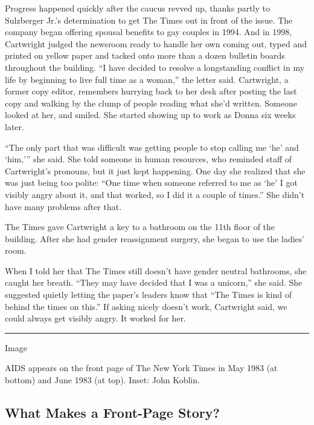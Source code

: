 Progress happened quickly after the caucus revved up, thanks partly to
Sulzberger Jr.'s determination to get The Times out in front of the
issue. The company began offering spousal benefits to gay couples in
1994. And in 1998, Cartwright judged the newsroom ready to handle her
own coming out, typed and printed on yellow paper and tacked onto more
than a dozen bulletin boards throughout the building. ``I have decided
to resolve a longstanding conflict in my life by beginning to live full
time as a woman,'' the letter said. Cartwright, a former copy editor,
remembers hurrying back to her desk after posting the last copy and
walking by the clump of people reading what she'd written. Someone
looked at her, and smiled. She started showing up to work as Donna six
weeks later.

``The only part that was difficult was getting people to stop calling me
`he' and `him,''' she said. She told someone in human resources, who
reminded staff of Cartwright's pronouns, but it just kept happening. One
day she realized that she was just being too polite: ``One time when
someone referred to me as `he' I got visibly angry about it, and that
worked, so I did it a couple of times.'' She didn't have many problems
after that.

The Times gave Cartwright a key to a bathroom on the 11th floor of the
building. After she had gender reassignment surgery, she began to use
the ladies' room.

When I told her that The Times still doesn't have gender neutral
bathrooms, she caught her breath. ``They may have decided that I was a
unicorn,'' she said. She suggested quietly letting the paper's leaders
know that ``The Times is kind of behind the times on this.'' If asking
nicely doesn't work, Cartwright said, we could always get visibly angry.
It worked for her.

\begin{center}\rule{0.5\linewidth}{\linethickness}\end{center}

Image

AIDS appears on the front page of The New York Times in May 1983 (at
bottom) and June 1983 (at top). Inset: John Koblin.

\hypertarget{what-makes-a-front-page-story}{%
\subsection{What Makes a Front-Page
Story?}\label{what-makes-a-front-page-story}}

